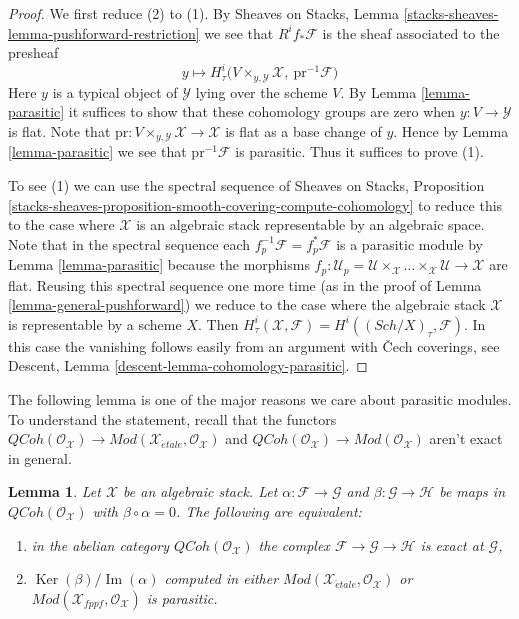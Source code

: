 \documentclass{stacks-project}
\theoremstyle{plain}
\newtheorem{lemma}[subsection]{Lemma}
\theoremstyle{definition}
\theoremstyle{remark}
\numberwithin{equation}{subsection}
\def\Sch{\mathit{Sch}}
\def\etale{{\acute{e}tale}}
\def\QCoh{\mathit{QCoh}}
\def\Ker{\mathop{\mathrm{Ker}}}
\def\Im{\mathop{\mathrm{Im}}}
\begin{document}
\begin{proof}
We first reduce (2) to (1).
By Sheaves on Stacks, Lemma \ref{stacks-sheaves-lemma-pushforward-restriction}
we see that $R^if_*\mathcal{F}$ is the sheaf associated to the presheaf
$$
y \longmapsto
H^i_\tau\Big(V \times_{y, \mathcal{Y}} \mathcal{X},
\ \text{pr}^{-1}\mathcal{F}\Big)
$$
Here $y$ is a typical object of $\mathcal{Y}$ lying over the scheme $V$.
By Lemma \ref{lemma-parasitic} it suffices to show that
these cohomology groups are zero when $y : V \to \mathcal{Y}$ is flat.
Note that $\text{pr} : V \times_{y, \mathcal{Y}} \mathcal{X} \to \mathcal{X}$
is flat as a base change of $y$. Hence by
Lemma \ref{lemma-parasitic} we see that $\text{pr}^{-1}\mathcal{F}$
is parasitic. Thus it suffices to prove (1).

\medskip\noindent
To see (1) we can use the spectral sequence of
Sheaves on Stacks, Proposition
\ref{stacks-sheaves-proposition-smooth-covering-compute-cohomology}
to reduce this to the case where $\mathcal{X}$
is an algebraic stack representable by an algebraic space.
Note that in the spectral sequence each
$f_p^{-1}\mathcal{F} = f_p^*\mathcal{F}$ is a parasitic module by
Lemma \ref{lemma-parasitic} because the morphisms
$f_p : \mathcal{U}_p =
\mathcal{U} \times_\mathcal{X} \ldots
\times_\mathcal{X} \mathcal{U} \to \mathcal{X}$ are flat.
Reusing this spectral sequence one more time (as in the
proof of Lemma \ref{lemma-general-pushforward})
we reduce to the case where the
algebraic stack $\mathcal{X}$ is representable by a scheme $X$.
Then $H^i_\tau(\mathcal{X}, \mathcal{F}) = H^i((\Sch/X)_\tau, \mathcal{F})$.
In this case the vanishing follows easily from an argument
with {\v C}ech coverings, see
Descent, Lemma \ref{descent-lemma-cohomology-parasitic}.
\end{proof}

\noindent
The following lemma is one of the major reasons we care about
parasitic modules. To understand the statement, recall that
the functors
$\QCoh(\mathcal{O}_\mathcal{X}) \to
\textit{Mod}(\mathcal{X}_\etale, \mathcal{O}_\mathcal{X})$
and
$\QCoh(\mathcal{O}_\mathcal{X}) \to
\textit{Mod}(\mathcal{O}_\mathcal{X})$
aren't exact in general.

\begin{lemma}
\label{lemma-exact-sequence-quasi-coherent-parasitic-cohomology}
Let $\mathcal{X}$ be an algebraic stack. Let
$\alpha : \mathcal{F} \to \mathcal{G}$ and
$\beta : \mathcal{G} \to \mathcal{H}$
be maps in $\QCoh(\mathcal{O}_\mathcal{X})$ with
$\beta \circ \alpha = 0$. The following are equivalent:
\begin{enumerate}
\item in the abelian category $\QCoh(\mathcal{O}_\mathcal{X})$
the complex $\mathcal{F} \to \mathcal{G} \to \mathcal{H}$
is exact at $\mathcal{G}$,
\item $\Ker(\beta)/\Im(\alpha)$ computed in either
$\textit{Mod}(\mathcal{X}_\etale, \mathcal{O}_\mathcal{X})$ or
$\textit{Mod}(\mathcal{X}_{fppf}, \mathcal{O}_\mathcal{X})$
is parasitic.
\end{enumerate}
\end{lemma}
\end{document}
